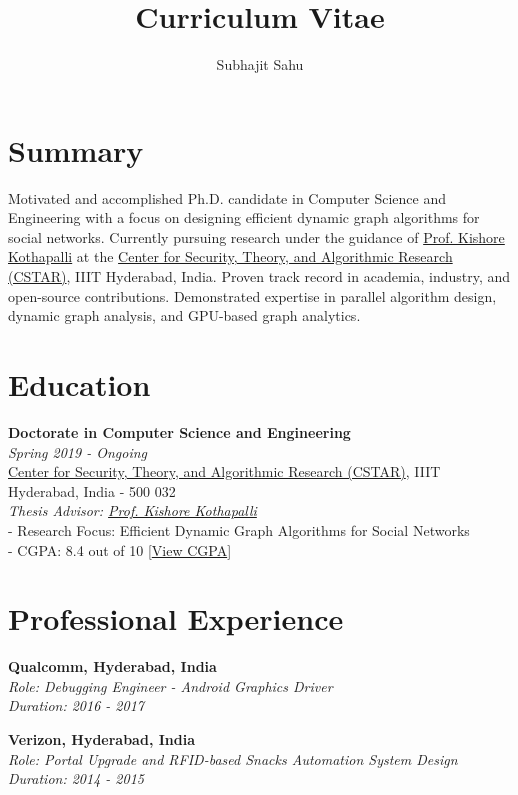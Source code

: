 \documentclass[a4paper,10pt]{article}
\begin{document}
\title{Curriculum Vitae}
\author{Subhajit Sahu}
\date{}
\maketitle

\section*{Summary}
Motivated and accomplished Ph.D. candidate in Computer Science and Engineering with a focus on designing efficient dynamic graph algorithms for social networks. Currently pursuing research under the guidance of \href{https://faculty.iiit.ac.in/~kkishore/}{Prof. Kishore Kothapalli} at the \href{https://cstar.iiit.ac.in}{Center for Security, Theory, and Algorithmic Research (CSTAR)}, IIIT Hyderabad, India. Proven track record in academia, industry, and open-source contributions. Demonstrated expertise in parallel algorithm design, dynamic graph analysis, and GPU-based graph analytics.

\section*{Education}
\textbf{Doctorate in Computer Science and Engineering} \\
\emph{Spring 2019 - Ongoing} \\
\href{https://cstar.iiit.ac.in}{Center for Security, Theory, and Algorithmic Research (CSTAR)}, IIIT Hyderabad, India - 500 032 \\
\emph{Thesis Advisor: \href{https://faculty.iiit.ac.in/~kkishore/}{Prof. Kishore Kothapalli}} \\
- Research Focus: Efficient Dynamic Graph Algorithms for Social Networks \\
- CGPA: 8.4 out of 10 [\href{https://drive.google.com/file/d/1c9goUgwXkyhsWIOc873RDhTk7nEs-hJ5/view?usp=sharing}{View CGPA}]

\section*{Professional Experience}
\textbf{Qualcomm, Hyderabad, India} \\
\emph{Role: Debugging Engineer - Android Graphics Driver} \\
\emph{Duration: 2016 - 2017}

\textbf{Verizon, Hyderabad, India} \\
\emph{Role: Portal Upgrade and RFID-based Snacks Automation System Design} \\
\emph{Duration: 2014 - 2015}
\end{document}
